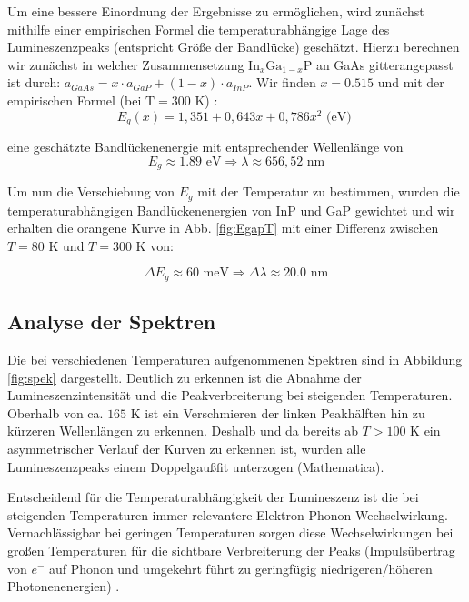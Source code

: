 \documentclass[aps,twocolumn,secnumarabic,nobalancelastpage,amsmath,amssymb,
nofootinbib,superscriptaddress]{revtex4-1}
\begin{document}
\noindent Um eine bessere Einordnung der Ergebnisse zu ermöglichen, wird zunächst mithilfe einer empirischen
Formel die temperaturabhängige Lage des Lumineszenzpeaks (entspricht Größe der Bandlücke) geschätzt.
Hierzu berechnen wir zunächst in welcher Zusammensetzung $\text{In}_x\text{Ga}_{1-x}\text{P}$
an GaAs gitterangepasst ist durch: $a_{GaAs} = x\cdot a_{GaP}+(1-x)\cdot a_{InP}$. Wir finden
$x=0.515$ und mit der empirischen Formel (bei $\text{T}=300\text{ K}$) \cite{vorbereitung}:
\begin{equation}
  E_{g}(x) = 1,351+0,643x+0,786x^2\text{ (eV) }
   \label{eq:Ex}
\end{equation}

\noindent eine geschätzte Bandlückenenergie mit entsprechender Wellenlänge von
\begin{equation}
  E_g \approx 1.89\text{ eV} \Rightarrow  \lambda \approx 656,52\text{ nm}
  \label{eq:evEgap300K}
\end{equation}

\noindent Um nun die Verschiebung von $E_g$ mit der Temperatur zu bestimmen, wurden
die temperaturabhängigen Bandlückenenergien von InP und GaP gewichtet und wir erhalten
die orangene Kurve in Abb. \ref{fig:EgapT} mit einer Differenz zwischen $T=80\text{ K}$
und $T=300\text{ K}$ von:

\begin{equation}
  \Delta E_g \approx 60\text{ meV} \Rightarrow \Delta\lambda \approx 20.0\text{ nm}
\label{eq:evVersch}
\end{equation}

\subsection{Analyse der Spektren}

\noindent Die bei verschiedenen Temperaturen aufgenommenen Spektren sind in Abbildung \ref{fig:spek} dargestellt.
Deutlich zu erkennen ist die Abnahme der Lumineszenzintensität und die Peakverbreiterung bei steigenden Temperaturen.
Oberhalb von ca. $165\text{ K}$ ist ein Verschmieren der linken Peakhälften hin zu kürzeren Wellenlängen zu erkennen.
Deshalb und da bereits ab $T>100$ K ein asymmetrischer Verlauf der Kurven zu erkennen ist, wurden alle Lumineszenzpeaks
einem Doppelgaußfit unterzogen (Mathematica).

Entscheidend für die Temperaturabhängigkeit der Lumineszenz ist die bei steigenden Temperaturen immer
relevantere Elektron-Phonon-Wechselwirkung. Vernachlässigbar bei geringen Temperaturen sorgen diese Wechselwirkungen
bei großen Temperaturen für die sichtbare Verbreiterung der Peaks (Impulsübertrag von $e^-$ auf Phonon und umgekehrt führt
zu geringfügig niedrigeren/höheren Photonenenergien) \cite{phonons}.
\end{document}
